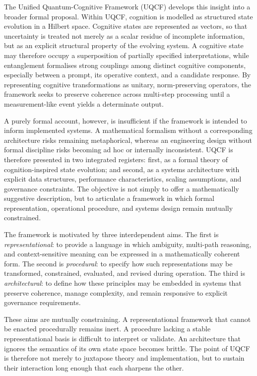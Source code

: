 \documentclass[12pt]{article}
\begin{document}
The Unified Quantum-Cognitive Framework (UQCF) develops this insight into a broader formal proposal. Within UQCF, cognition is modelled as structured state evolution in a Hilbert space. Cognitive states are represented as vectors, so that uncertainty is treated not merely as a scalar residue of incomplete information, but as an explicit structural property of the evolving system. A cognitive state may therefore occupy a superposition of partially specified interpretations, while entanglement formalises strong couplings among distinct cognitive components, especially between a prompt, its operative context, and a candidate response. By representing cognitive transformations as unitary, norm-preserving operators, the framework seeks to preserve coherence across multi-step processing until a measurement-like event yields a determinate output.

A purely formal account, however, is insufficient if the framework is intended to inform implemented systems. A mathematical formalism without a corresponding architecture risks remaining metaphorical, whereas an engineering design without formal discipline risks becoming ad hoc or internally inconsistent. UQCF is therefore presented in two integrated registers: first, as a formal theory of cognition-inspired state evolution; and second, as a systems architecture with explicit data structures, performance characteristics, scaling assumptions, and governance constraints. The objective is not simply to offer a mathematically suggestive description, but to articulate a framework in which formal representation, operational procedure, and systems design remain mutually constrained.

The framework is motivated by three interdependent aims. The first is \emph{representational}: to provide a language in which ambiguity, multi-path reasoning, and context-sensitive meaning can be expressed in a mathematically coherent form. The second is \emph{procedural}: to specify how such representations may be transformed, constrained, evaluated, and revised during operation. The third is \emph{architectural}: to define how these principles may be embedded in systems that preserve coherence, manage complexity, and remain responsive to explicit governance requirements.

These aims are mutually constraining. A representational framework that cannot be enacted procedurally remains inert. A procedure lacking a stable representational basis is difficult to interpret or validate. An architecture that ignores the semantics of its own state space becomes brittle. The point of UQCF is therefore not merely to juxtapose theory and implementation, but to sustain their interaction long enough that each sharpens the other.
\end{document}

